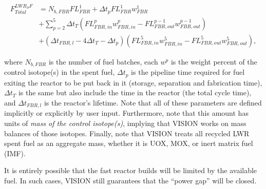 \begin{equation*}
\begin{aligned}
F^{LWR_SF}_{Total} & = N_{b,FBR} FL^1_{FBR} + \Delta t_p FL^1_{FBR} w^1_{FBR} \\
                   & + \sum_{p=2}^{5} \Delta t_T (FL^p_{FBR,in} w^p_{FBR,in} - FL^{p-1}_{FBR,out} w^{p-1}_{FBR,out}) \\
                   & + (\Delta t_{FBR,l} - 4 \Delta t_T - \Delta t_p) (FL^5_{FBR,in} w^5_{FBR,in} - FL^{5}_{FBR,out} w^{5}_{FBR,out}),
\end{aligned}
\end{equation*}

where $N_{b,FBR}$ is the number of fuel batches, each $w^p$ is the weight
percent of the control isotope(s) in the spent fuel, $\Delta t_p$ is the
pipeline time required for fuel exiting the reactor to be put back in it
(storage, separation and fabrication time), $\Delta t_T$ is the same but also
include the time in the reactor (the total cycle time), and $\Delta t_{FBR,l}$
is the reactor's lifetime. Note that all of these parameters are defined
implicitly or explicitly by user input. Furthermore, note that this amount has
units of \textit{mass of the control isotope(s)}, implying that VISION works on
mass balances of those isotopes. Finally, note that VISION treats all recycled
LWR spent fuel as an aggregate mass, whether it is UOX, MOX, or inert matrix
fuel (IMF).

It is entirely possible that the fast reactor builds will be limited by the
available fuel. In such cases, VISION still guarantees that the ``power gap''
will be closed.
